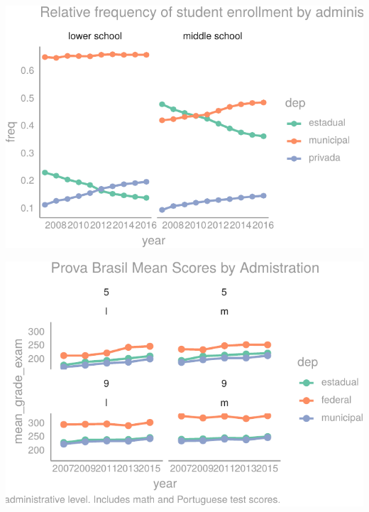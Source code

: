 \documentclass[12pt,]{article}
\begin{document}
\begin{center}\includegraphics{dissertation_files/figure-latex/unnamed-chunk-10-1} \end{center}

\begin{center}\includegraphics{dissertation_files/figure-latex/unnamed-chunk-11-1} \end{center}
\end{document}
